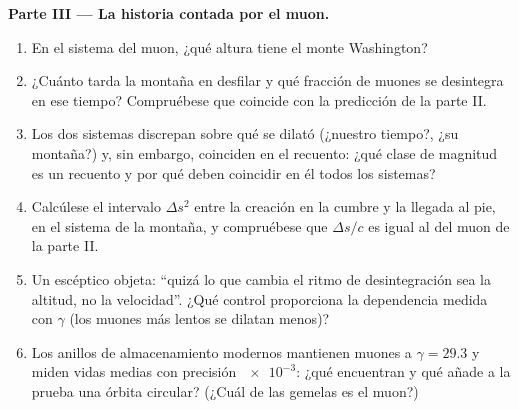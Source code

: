 \begin{problem}
\medskip\noindent\textbf{Parte III --- La historia contada por el muon.}
\begin{enumerate}[resume]
  \item En el sistema del muon, ¿qué altura tiene el monte Washington?
  \item ¿Cuánto tarda la montaña en desfilar y qué fracción de muones
        se desintegra en ese tiempo? Compruébese que coincide con la
        predicción de la parte II.
  \item Los dos sistemas discrepan sobre qué se dilató (¿nuestro
        tiempo?, ¿su montaña?) y, sin embargo, coinciden en el
        recuento: ¿qué clase de magnitud es un recuento y por qué
        deben coincidir en él todos los sistemas?
  \item Calcúlese el intervalo $\Delta s^2$ entre la creación en la
        cumbre y la llegada al pie, en el sistema de la montaña, y
        compruébese que $\Delta s/c$ es igual al  del muon
        de la parte II.
  \item Un escéptico objeta: ``quizá lo que cambia el ritmo de
        desintegración sea la altitud, no la velocidad''. ¿Qué control
        proporciona la dependencia medida con $\gamma$ (los muones más
        lentos se dilatan menos)?
  \item Los anillos de almacenamiento modernos mantienen muones a
        $\gamma = 29.3$ y miden vidas medias con precisión
        $\num{e-3}$: ¿qué encuentran y qué añade a la prueba una órbita
        circular? (¿Cuál de las gemelas es el muon?)
\end{enumerate}


\end{problem}
